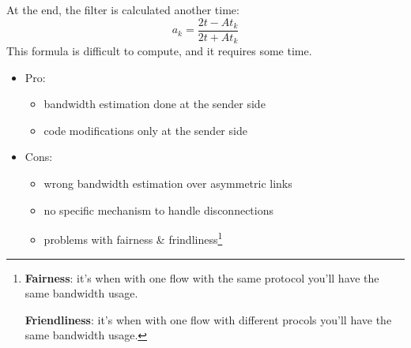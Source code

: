 At the end, the filter is calculated another time:
\begin{equation}
a_k = \frac{2t - At_k}{2t + At_k}
\end{equation}
This formula is difficult to compute, and it requires some time.
\begin{itemize}
\item Pro:
  \begin{itemize}
    \item bandwidth estimation done at the sender side
    \item code modifications only at the sender side
  \end{itemize}
\item Cons:
  \begin{itemize}
  \item wrong bandwidth estimation over asymmetric links
  \item no specific mechanism to handle disconnections
  \item problems with fairness \& frindliness\footnote{\textbf{Fairness}:
    it's when with one flow with the same protocol you'll have the same
    bandwidth usage.
    
    \textbf{Friendliness}: it's when with one flow with different procols you'll
    have the same bandwidth usage.}
  \end{itemize}
\end{itemize}
